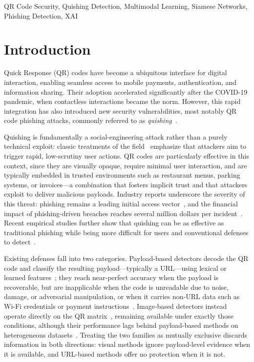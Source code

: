 \documentclass[conference]{IEEEtran}
\begin{document}
\begin{IEEEkeywords}
QR Code Security, Quishing Detection, Multimodal Learning, Siamese Networks, Phishing Detection, XAI
\end{IEEEkeywords}

\section{Introduction}

Quick Response (QR) codes have become a ubiquitous interface for digital interaction, enabling seamless access to mobile payments, authentication, and information sharing. Their adoption accelerated significantly after the COVID-19 pandemic, when contactless interactions became the norm. However, this rapid integration has also introduced new security vulnerabilities, most notably QR code phishing attacks, commonly referred to as \textit{quishing}~\cite{sharevski2022phishing}.

Quishing is fundamentally a social-engineering attack rather than a purely technical exploit: classic treatments of the field~\cite{mitnick2002artdeception, hadnagy2018socialengineering} emphasize that attackers aim to trigger rapid, low-scrutiny user actions. QR codes are particularly effective in this context, since they are visually opaque, require minimal user interaction, and are typically embedded in trusted environments such as restaurant menus, parking systems, or invoices---a combination that fosters implicit trust and that attackers exploit to deliver malicious payloads. Industry reports underscore the severity of this threat: phishing remains a leading initial access vector~\cite{verizon2024dbir}, and the financial impact of phishing-driven breaches reaches several million dollars per incident~\cite{ibm2024cost}. Recent empirical studies further show that quishing can be as effective as traditional phishing while being more difficult for users and conventional defenses to detect~\cite{weinz2025impact, geisler2024hooked}.

Existing defenses fall into two categories. Payload-based detectors decode the QR code and classify the resulting payload---typically a URL---using lexical or learned features~\cite{khalifa2025multiphishnet, nejati2026cic}; they reach near-perfect accuracy when the payload is recoverable, but are inapplicable when the code is unreadable due to noise, damage, or adversarial manipulation, or when it carries non-URL data such as Wi-Fi credentials or payment instructions~\cite{trad2025detecting}. Image-based detectors instead operate directly on the QR matrix~\cite{trad2025detecting}, remaining available under exactly those conditions, although their performance lags behind payload-based methods on heterogeneous datasets~\cite{nejati2026cic}. Treating the two families as mutually exclusive discards information in both directions: visual methods ignore payload-level evidence when it is available, and URL-based methods offer no protection when it is not.
\end{document}
